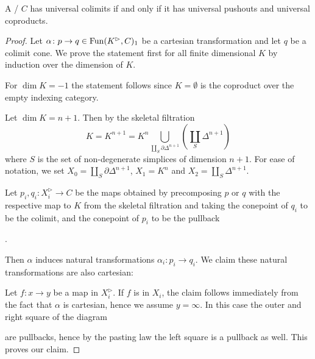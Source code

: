 \begin{lemma}\label{lem:univColimIffUnivPoAndCoprod}
    A \inftycat/ $C$ has universal colimits if and only if it has universal pushouts and universal coproducts.
    \begin{proof}
        Let $\alpha\colon p\to q\in\operatorname{Fun}(K^{\rhd},C)_1$ be a cartesian transformation and let $q$ be a colimit cone. 
        We prove the statement first for all finite dimensional $K$ by induction over the dimension of $K$.

        For $\dim K=-1$ the statement follows since $K=\emptyset$ is the coproduct over the empty indexing category.
        
        Let $\dim K=n+1$. 
        Then by the skeletal filtration
        \begin{equation*}
            K=K^{n+1}=K^n\bigcup\limits_{\coprod\limits_S \partial\Delta^{n+1}}\left(\coprod_S \Delta^{n+1}\right)
        \end{equation*}
        where $S$ is the set of non-degenerate simplices of dimension $n+1$.
        For ease of notation, we set $X_{0}=\coprod\limits_S \partial\Delta^{n+1}$, $X_1=K^n$ and $X_2=\coprod\limits_S \Delta^{n+1}$.

        Let $p_i,q_i\colon X_i^{\rhd}\to C$ be the maps obtained by precomposing $p$ or $q$ with the respective map to $K$ from the skeletal filtration and taking the conepoint of $q_i$ to be the colimit, and the conepoint of $p_i$ to be the pullback 
        \begin{center}
            \;.
        \end{center}
        Then $\alpha$ induces natural transformations $\alpha_i\colon p_i\to q_i$.
        We claim these natural transformations are also cartesian:

        Let $f\colon x\to y$ be a map in $X_i^{\rhd}$. 
        If $f$ is in $X_i$, the claim follows immediately from the fact that $\alpha$ is cartesian, hence we assume $y=\infty$.
        In this case the outer and right square of the diagram
        \begin{center}
        \end{center}
        are pullbacks, hence by the pasting law the left square is a pullback as well.
        This proves our claim.


\end{proof}
\end{lemma}
